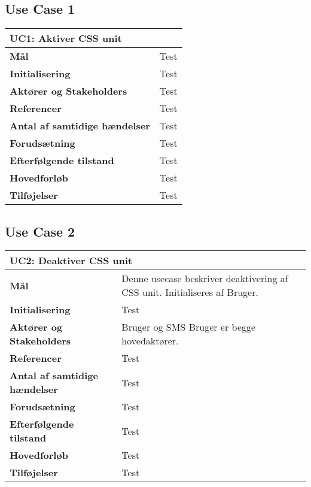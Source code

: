 \subsection{Use Case 1}
\begin{table}[htbp] \centering
\begin{tabular}{|l|l|} %
	\hline
\multicolumn{2}{|l|}{\textbf{UC1: Aktiver CSS unit}} \\\hline
\textbf{Mål}								&Test \\\hline
\textbf{Initialisering}					&Test \\\hline
\textbf{Aktører og Stakeholders}			&Test \\\hline
\textbf{Referencer}						&Test \\\hline
\textbf{Antal af samtidige hændelser}	&Test \\\hline
\textbf{Forudsætning}					&Test \\\hline
\textbf{Efterfølgende tilstand}			&Test \\\hline
\textbf{Hovedforløb}						&Test \\\hline
\textbf{Tilføjelser}						&Test \\\hline
	\end{tabular}
	\label{UC1} 
\end{table}

\subsection{Use Case 2}
\begin{table}[htbp] \centering
\begin{tabular}{|p{7cm}|p{7cm}|} %
	\hline
\multicolumn{2}{|l|}{\textbf{UC2: Deaktiver CSS unit}} \\\hline
\textbf{Mål}	&
Denne usecase beskriver deaktivering af CSS unit. Initialiseres af Bruger. 
\\\hline
\textbf{Initialisering} &
Test 
\\\hline
\textbf{Aktører og Stakeholders}	&
Bruger og SMS Bruger er begge hovedaktører.
\\\hline
\textbf{Referencer} &
Test 
\\\hline
\textbf{Antal af samtidige hændelser} &
Test 
\\\hline
\textbf{Forudsætning} &
Test 
\\\hline
\textbf{Efterfølgende tilstand} &
Test 
\\\hline
\textbf{Hovedforløb}	&
Test 
\\\hline
\textbf{Tilføjelser}	&
Test 
\\\hline
	\end{tabular}
	\label{tab:UC2} 
\end{table}

